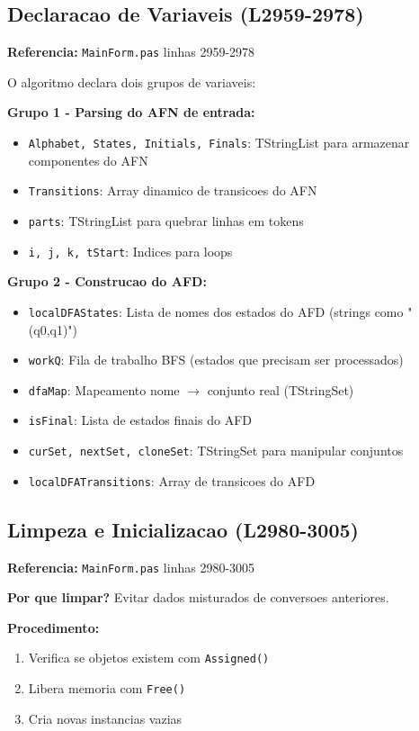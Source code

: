 \documentclass[12pt,a4paper]{article}
\begin{document}
\subsection{Declaracao de Variaveis (L2959-2978)}

\textbf{Referencia:} \texttt{MainForm.pas} linhas 2959-2978

O algoritmo declara dois grupos de variaveis:

\textbf{Grupo 1 - Parsing do AFN de entrada:}
\begin{itemize}
    \item \texttt{Alphabet, States, Initials, Finals}: TStringList para armazenar componentes do AFN
    \item \texttt{Transitions}: Array dinamico de transicoes do AFN
    \item \texttt{parts}: TStringList para quebrar linhas em tokens
    \item \texttt{i, j, k, tStart}: Indices para loops
\end{itemize}

\textbf{Grupo 2 - Construcao do AFD:}
\begin{itemize}
    \item \texttt{localDFAStates}: Lista de nomes dos estados do AFD (strings como "(q0,q1)")
    \item \texttt{workQ}: Fila de trabalho BFS (estados que precisam ser processados)
    \item \texttt{dfaMap}: Mapeamento nome $\rightarrow$ conjunto real (TStringSet)
    \item \texttt{isFinal}: Lista de estados finais do AFD
    \item \texttt{curSet, nextSet, cloneSet}: TStringSet para manipular conjuntos
    \item \texttt{localDFATransitions}: Array de transicoes do AFD
\end{itemize}

\subsection{Limpeza e Inicializacao (L2980-3005)}

\textbf{Referencia:} \texttt{MainForm.pas} linhas 2980-3005

\textbf{Por que limpar?} Evitar dados misturados de conversoes anteriores.

\textbf{Procedimento:}
\begin{enumerate}
    \item Verifica se objetos existem com \texttt{Assigned()}
    \item Libera memoria com \texttt{Free()}
    \item Cria novas instancias vazias
\end{enumerate}
\end{document}
